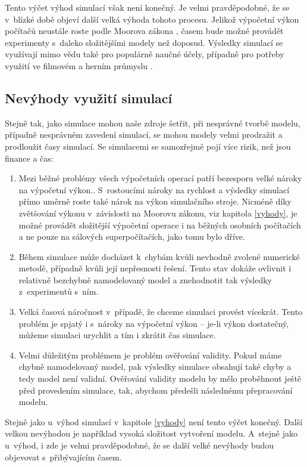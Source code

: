 Tento výčet výhod simulací však není konečný. Je velmi pravděpodobné, že se v~blízké době objeví další velká výhoda tohoto procesu. Jelikož výpočetní výkon počítačů neustále roste podle Moorova zákona \cite{Schaller1997}, časem bude možné provádět experimenty s~daleko složitějšími modely než doposud. Výsledky simulací se využívají mimo vědu také pro populárně naučné účely, případně pro potřeby využití ve filmovém a herním průmyslu \cite{James_2015}.

\subsection*{Nevýhody využití simulací}

Stejně tak, jako simulace mohou naše zdroje šetřit, při nesprávné tvorbě modelu, případně nesprávném zavedení simulací, se mohou modely velmi prodražit a prodloužit časy simulací. Se simulacemi se samozřejmě pojí více rizik, než jsou finance a čas:

\begin{enumerate}
    \item Mezi běžné problémy všech výpočetních operací patří bezesporu velké nároky na výpočetní výkon.. S~rostoucími nároky na rychlost a výsledky simulací přímo uměrně roste také nárok na výkon simulačního stroje. Nicméně díky zvětšování výkonu v~závislosti na Moorovu zákonu, viz kapitola \ref{vyhody}, je možné provádět složitější výpočetní operace i na běžných osobních počítačích a ne pouze na sálových superpočítačích, jako tomu bylo dříve.
    \item Během simulace může docházet k~chybám kvůli nevhodně zvolené numerické metodě, případně kvůli její nepřesnosti řešení. Tento stav dokáže ovlivnit i relativně bezchybně namodelovaný model a znehodnotit tak výsledky z~experimentů s~ním.
    \item Velká časová náročnost v~případě, že chceme simulaci provést vícekrát. Tento problém je spjatý i s~nároky na výpočetní výkon -- je-li výkon dostatečný, můžeme simulaci urychlit a tím i zkrátit čas simulace.
    \item Velmi důležitým problémem je problém ověřování validity. Pokud máme chybně namodelovaný model, pak výsledky simulace obsahují také chyby a tedy model není validní. Ověřování validity modelu by mělo proběhnout ještě před provedením simulace, tak, abychom předešli následnému přepracování modelu.
\end{enumerate}

Stejně jako u~výhod simulací v~kapitole \ref{vyhody} není tento výčet konečný. Další velkou nevýhodou je například vysoká složitost vytvoření modelu. A~stejně jako u~výhod, i zde je velmi pravděpodobné, že se další velké nevýhody budou objevovat s~přibývajícím časem.

